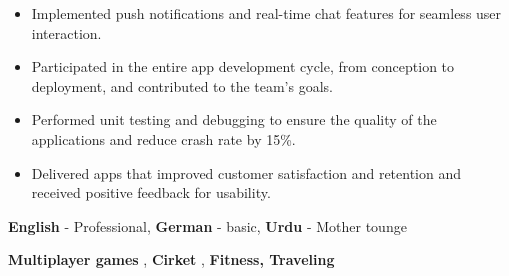 \documentclass[9pt]{developercv}
\begin{document}
\begin{entrylist}
{\begin{itemize}[noitemsep,topsep=0pt,parsep=0pt,partopsep=0pt, leftmargin=-1pt]
         \item {Implemented push notifications and real-time chat features for seamless user interaction.}

         \item {Participated in the entire app development cycle, from conception to deployment, and contributed to the team’s goals.}

         \item {Performed unit testing and debugging to ensure the quality of the applications and reduce crash rate by 15\%.}

         \item {Delivered apps that improved customer satisfaction and retention and received positive feedback for usability.}

      \end{itemize}
   }

\end{entrylist}

\vspace{-10 pt}
\vspace{-6pt}

\hspace{26mm} \textbf{English} - Professional, \textbf{ German} - basic, \textbf{ Urdu} - Mother tounge



\vspace{-10 pt}
\vspace{-6pt}

\hspace{26mm} \textbf{Multiplayer games} , \textbf{ Cirket} , \textbf{ Fitness, Traveling}

\end{document}
